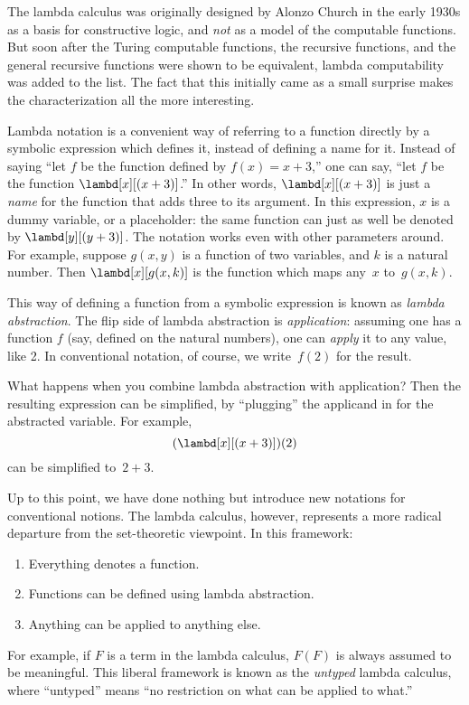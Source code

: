 \documentclass[../../../include/open-logic-section]{subfiles}
\begin{document}

The lambda calculus was originally designed by Alonzo Church in the
early 1930s as a basis for constructive logic, and \emph{not} as a
model of the computable functions. But soon after the Turing
computable functions, the recursive functions, and the general
recursive functions were shown to be equivalent, lambda computability
was added to the list. The fact that this initially came as a small
surprise makes the characterization all the more interesting.

Lambda notation is a convenient way of referring to a function
directly by a symbolic expression which defines it, instead of
defining a name for it. Instead of saying ``let $f$ be the function
defined by $f(x) = x + 3$,'' one can say, ``let $f$ be the function
$\lambd[x][(x + 3)]$.''  In other words, $\lambd[x][(x+3)]$ is just a
\emph{name} for the function that adds three to its argument. In this
expression, $x$ is a dummy variable, or a placeholder: the same
function can just as well be denoted by $\lambd[y][(y + 3)]$. The
notation works even with other parameters around. For example, suppose
$g(x, y)$ is a function of two variables, and $k$ is a natural
number. Then $\lambd[x][g(x,k)]$ is the function which maps any~$x$
to~$g(x, k)$.

This way of defining a function from a symbolic expression is known as
\emph{lambda abstraction}. The flip side of lambda abstraction is
\emph{application}: assuming one has a function $f$ (say, defined on
the natural numbers), one can \emph{apply} it to any value, like 2. In
conventional notation, of course, we write~$f(2)$ for the result.

What happens when you combine lambda abstraction with application?
Then the resulting expression can be simplified, by ``plugging'' the
applicand in for the abstracted variable. For example,
\[
(\lambd[x][(x + 3)])(2)
\]
can be simplified to~$2 + 3$.

Up to this point, we have done nothing but introduce new notations for
conventional notions. The lambda calculus, however, represents a more
radical departure from the set-theoretic viewpoint. In this framework:
\begin{enumerate}
\item Everything denotes a function.
\item Functions can be defined using lambda abstraction.
\item Anything can be applied to anything else.
\end{enumerate}
For example, if $F$ is a term in the lambda calculus, $F(F)$ is always
assumed to be meaningful. This liberal framework is known as the
\emph{untyped} lambda calculus, where ``untyped'' means ``no
restriction on what can be applied to what.''
\end{document}
